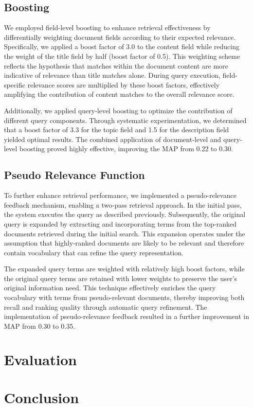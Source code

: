 \documentclass[sigplan,screen,nonacm]{acmart}
\begin{document}
\subsection{Boosting}

We employed field-level boosting to enhance retrieval effectiveness by differentially weighting document fields according to their expected relevance. Specifically, we applied a boost factor of 3.0 to the content field while reducing the weight of the title field by half (boost factor of 0.5). This weighting scheme reflects the hypothesis that matches within the document content are more indicative of relevance than title matches alone. During query execution, field-specific relevance scores are multiplied by these boost factors, effectively amplifying the contribution of content matches to the overall relevance score.

Additionally, we applied query-level boosting to optimize the contribution of different query components. Through systematic experimentation, we determined that a boost factor of 3.3 for the topic field and 1.5 for the description field yielded optimal results. The combined application of document-level and query-level boosting proved highly effective, improving the MAP from 0.22 to 0.30.

\subsection{Pseudo Relevance Function}

To further enhance retrieval performance, we implemented a pseudo-relevance feedback mechanism, enabling a two-pass retrieval approach. In the initial pass, the system executes the query as described previously. Subsequently, the original query is expanded by extracting and incorporating terms from the top-ranked documents retrieved during the initial search. This expansion operates under the assumption that highly-ranked documents are likely to be relevant and therefore contain vocabulary that can refine the query representation.

The expanded query terms are weighted with relatively high boost factors, while the original query terms are retained with lower weights to preserve the user's original information need. This technique effectively enriches the query vocabulary with terms from pseudo-relevant documents, thereby improving both recall and ranking quality through automatic query refinement. The implementation of pseudo-relevance feedback resulted in a further improvement in MAP from 0.30 to 0.35.


\section{Evaluation}

\section{Conclusion}

\cite{Sufi2024}
\cite{Cai24}
\cite{DeshmukhSethi2020}
\cite{Bronson2025}



\end{document}
